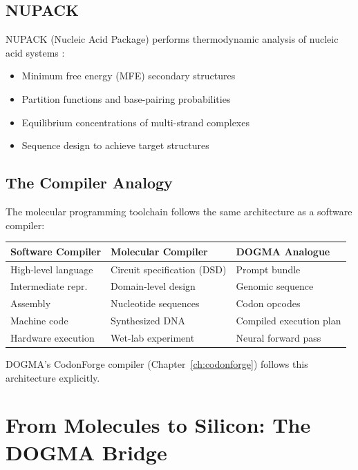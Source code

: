 \subsection{NUPACK}

NUPACK (Nucleic Acid Package) performs thermodynamic analysis of nucleic acid systems \citep{zadeh2011nupack}:
\begin{itemize}[leftmargin=1.8em]
  \item Minimum free energy (MFE) secondary structures
  \item Partition functions and base-pairing probabilities
  \item Equilibrium concentrations of multi-strand complexes
  \item Sequence design to achieve target structures
\end{itemize}

\subsection{The Compiler Analogy}

The molecular programming toolchain follows the same architecture as a software compiler:

\begin{center}
\renewcommand{\arraystretch}{1.15}
\begin{tabularx}{0.95\textwidth}{L{3.5cm} L{3.5cm} Y}
\toprule
\textbf{Software Compiler} & \textbf{Molecular Compiler} & \textbf{DOGMA Analogue} \\
\midrule
High-level language & Circuit specification (DSD) & Prompt bundle \\
Intermediate repr. & Domain-level design & Genomic sequence \\
Assembly & Nucleotide sequences & Codon opcodes \\
Machine code & Synthesized DNA & Compiled execution plan \\
Hardware execution & Wet-lab experiment & Neural forward pass \\
\bottomrule
\end{tabularx}
\end{center}

DOGMA's CodonForge compiler (Chapter~\ref{ch:codonforge}) follows this architecture explicitly.

\section{From Molecules to Silicon: The DOGMA Bridge}
\label{sec:dogma-bridge}

